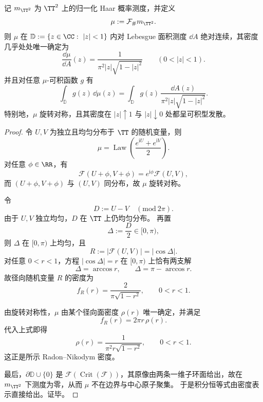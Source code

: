 \begin{theorem}\label{thm:cdim-biphase-average-haar-pushforward-density}
记 \(m_{\TT^2}\) 为 \(\TT^2\) 上的归一化 Haar 概率测度，并定义
\[
\mu:=\mathcal F_{\#}m_{\TT^2}.
\]
则 \(\mu\) 在 \(\mathbb D:=\{z\in\CC:\ |z|<1\}\) 内对 Lebesgue 面积测度 \(\dd A\) 绝对连续，其密度几乎处处唯一确定为
\[
\frac{\dd\mu}{\dd A}(z)
=
\frac{1}{\pi^2|z|\sqrt{1-|z|^2}}
\qquad
(0<|z|<1).
\]
并且对任意 \(\mu\)-可积函数 \(g\) 有
\[
\int_{\overline{\mathbb D}} g(z)\,\dd\mu(z)
=
\int_{\mathbb D} g(z)\,\frac{\dd A(z)}{\pi^2|z|\sqrt{1-|z|^2}}.
\]
特别地，\(\mu\) 旋转对称，且其密度在 \(|z|\uparrow 1\) 与 \(|z|\downarrow 0\) 处都呈可积型发散。
\end{theorem}
\begin{proof}
令 \(U,V\) 为独立且均匀分布于 \(\TT\) 的随机变量，则
\[
\mu=\operatorname{Law}\!\left(\frac{e^{\mathrm{i}U}+e^{\mathrm{i}V}}{2}\right).
\]
对任意 \(\phi\in\RR\)，有
\[
\mathcal F(U+\phi,V+\phi)=e^{\mathrm{i}\phi}\mathcal F(U,V),
\]
而 \((U+\phi,V+\phi)\) 与 \((U,V)\) 同分布，故 \(\mu\) 旋转对称。

令
\[
D:=U-V \quad (\mathrm{mod}\ 2\pi).
\]
由于 \(U,V\) 独立均匀，\(D\) 在 \(\TT\) 上仍均匀分布。
再置
\[
\Delta:=\frac{D}{2}\in[0,\pi),
\]
则 \(\Delta\) 在 \([0,\pi)\) 上均匀，且
\[
R:=\left|\mathcal F(U,V)\right|=|\cos\Delta|.
\]
对任意 \(0<r<1\)，方程 \(|\cos\Delta|=r\) 在 \([0,\pi)\) 上恰有两支解
\[
\Delta=\arccos r,
\qquad
\Delta=\pi-\arccos r.
\]
故径向随机变量 \(R\) 的密度为
\[
f_R(r)=\frac{2}{\pi\sqrt{1-r^2}},
\qquad 0<r<1.
\]

由旋转对称性，\(\mu\) 由某个径向面密度 \(\rho(r)\) 唯一确定，并满足
\[
f_R(r)=2\pi r\,\rho(r).
\]
代入上式即得
\[
\rho(r)=\frac{1}{\pi^2 r\sqrt{1-r^2}},
\qquad 0<r<1.
\]
这正是所示 Radon--Nikodym 密度。

最后，\(\partial\mathbb D\cup\{0\}\) 是 \(\mathcal F(\operatorname{Crit}(\mathcal F))\)，其原像由两条一维子环面给出，故在 \(m_{\TT^2}\) 下测度为零，从而 \(\mu\) 不在边界与中心原子聚集。
于是积分恒等式由密度表示直接给出。证毕。
\end{proof}

